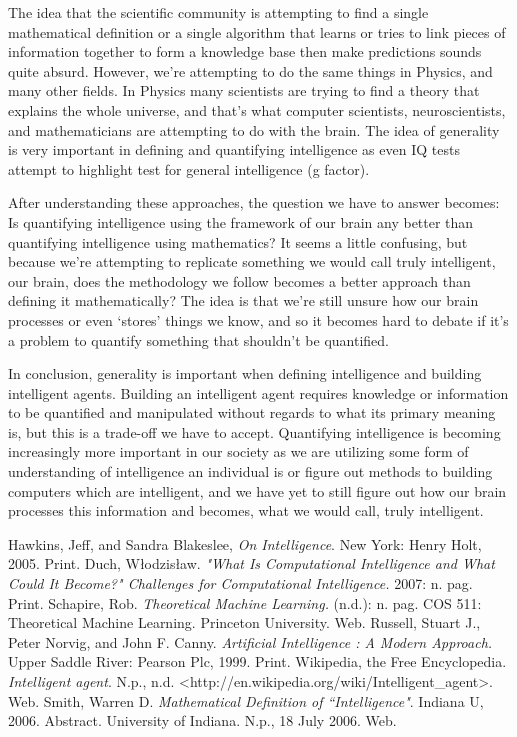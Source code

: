 \documentclass[11pt, oneside]{article}
\begin{document}
\par The idea that the scientific community is attempting to find a single mathematical definition or a single algorithm that learns or tries to link pieces of information together to form a knowledge base then make predictions sounds quite absurd. However, we're attempting to do the same things in Physics, and many other fields. In Physics many scientists are trying to find a theory that explains the whole universe, and that's what computer scientists, neuroscientists, and mathematicians are attempting to do with the brain. The idea of generality is very important in defining and quantifying intelligence as even IQ tests attempt to highlight test for general intelligence (g factor). 

\par After understanding these approaches, the question we have to answer becomes: Is quantifying intelligence using the framework of our brain any better than quantifying intelligence using mathematics? It seems a little confusing, but because we're attempting to replicate something we would call truly intelligent, our brain, does the methodology we follow becomes a better approach than defining it mathematically? The idea is that we're still unsure how our brain processes or even `stores' things we know, and so it becomes hard to debate if it's a problem to quantify something that shouldn't be quantified. 


\par In conclusion, generality is important when defining intelligence and building intelligent agents. Building an intelligent agent requires knowledge or information to be quantified and manipulated without regards to what its primary meaning is, but this is a trade-off we have to accept. Quantifying intelligence is becoming increasingly more important in our society as we are utilizing some form of understanding of intelligence an individual is or figure out methods to building computers which are intelligent, and we have yet to still figure out how our brain processes this information and becomes, what we would call, truly intelligent.

\begin{thebibliography}{9}
	Hawkins, Jeff, and Sandra Blakeslee,
	\emph{On Intelligence}.
	New York: Henry Holt, 2005.
	Print.
	Duch, W\l{}odzis\l{}aw.
	\emph{"What Is Computational Intelligence and What Could It Become?" Challenges for Computational Intelligence.}
	2007: n. pag. Print.
	Schapire, Rob. 
	\emph{Theoretical Machine Learning.} 
	(n.d.): n. pag. COS 511: Theoretical Machine Learning. Princeton University. 
	Web.
	Russell, Stuart J., Peter Norvig, and John F. Canny. 
	\emph{Artificial Intelligence : A Modern Approach.}
	Upper Saddle River: Pearson Plc, 1999. Print.
	Wikipedia, the Free Encyclopedia. 
	\emph{Intelligent agent}.
	N.p., n.d. <http://en.wikipedia.org/wiki/Intelligent\_agent>.
	Web.
	Smith, Warren D. 
	\emph{Mathematical Definition of ``Intelligence"}.
	Indiana U, 2006. Abstract. University of Indiana. N.p., 18 July 2006. 
	Web.
\end{thebibliography}
\end{document}
